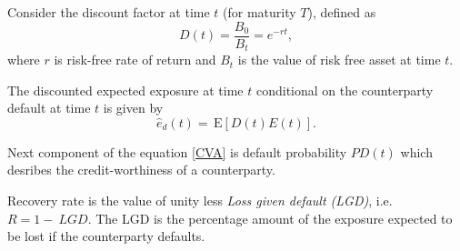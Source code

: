 \documentclass{amsart}
\theoremstyle{definition}\newtheorem{definition}[theorem]{Definition}
\theoremstyle{remark}\newtheorem{remark}[theorem]{Remark}
\newcommand{\E}{\,\mathrm{E}}
\begin{document}
Consider the discount factor at time $t$ (for maturity $T$), defined as 
\begin{equation}
D(t)=\frac{B_0}{B_t}=e^{-rt},
\end{equation}
where $r$ is risk-free rate of return and $B_t$ is the value of risk free asset at time $t$. 

The discounted expected exposure at time $t$ conditional on the counterparty default at time $t$ is given by 
\begin{equation}
\hat{e}_d(t)=\E[D(t) E(t)].
\end{equation}


Next component of the equation \eqref{CVA} is default probability $PD(t)$ which desribes the credit-worthiness of a counterparty. 

Recovery rate is the value of unity less \textit{Loss given default (LGD)}, i.e. $R=1-~LGD$.
The LGD is the percentage amount of the exposure expected to be lost if the counterparty defaults.

\begin{table}
\caption{Resulting CVA}
\end{table}

\end{document}
